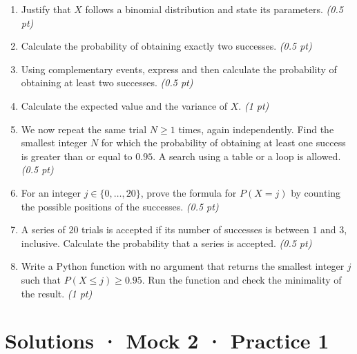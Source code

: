\begin{enumerate}

\item Justify that $X$ follows a binomial distribution and state its parameters. \hfill\textit{(0.5 pt)}

\item Calculate the probability of obtaining exactly two successes. \hfill\textit{(0.5 pt)}

\item Using complementary events, express and then calculate the probability of obtaining at least two successes. \hfill\textit{(0.5 pt)}

\item Calculate the expected value and the variance of $X$. \hfill\textit{(1 pt)}

\item We now repeat the same trial $N\ge1$ times, again independently. Find the smallest integer $N$ for which the probability of obtaining at least one success is greater than or equal to $0.95$. A search using a table or a loop is allowed. \hfill\textit{(0.5 pt)}

\item For an integer $j\in\{0,\ldots,20\}$, prove the formula for $P(X=j)$ by counting the possible positions of the successes. \hfill\textit{(0.5 pt)}

\item A series of $20$ trials is accepted if its number of successes is between $1$ and $3$, inclusive. Calculate the probability that a series is accepted. \hfill\textit{(0.5 pt)}

\item Write a Python function with no argument that returns the smallest integer $j$ such that $P(X\le j)\ge0.95$. Run the function and check the minimality of the result. \hfill\textit{(1 pt)}

\end{enumerate}

\ifprof\clearpage

\section*{Solutions · Mock 2 · Practice 1}\label{cor:8-1}


